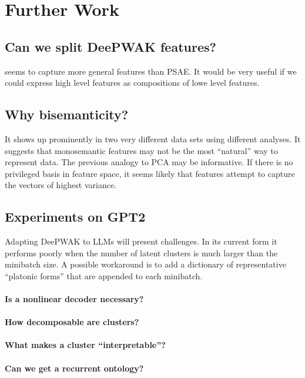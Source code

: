 \section{Further Work}

\subsection{Can we split DeePWAK features?}
\DeePWAK seems to capture more general features than PSAE.
It would be very useful if we could express high level features as compositions of lowe level features.

\subsection{Why bisemanticity?}
It shows up prominently in two very different data sets using different analyses.
It suggests that monosemantic features may not be the most ``natural'' way to represent data.
The previous analogy to PCA may be informative.
If there is no privileged basis in feature space, it seems likely that features attempt to capture the vectors of highest variance.

\subsection{Experiments on GPT2}
Adapting DeePWAK to LLMs will present challenges.
In its current form it performs poorly when the number of latent clusters is much larger than the minibatch size.
A possible workaround is to add a dictionary of representative ``platonic forms'' that are appended to each minibatch.

\paragraph{Is a nonlinear decoder necessary?}

\paragraph{How decomposable are clusters?}

\paragraph{What makes a cluster ``interpretable''?}

\paragraph{Can we get a recurrent ontology?}